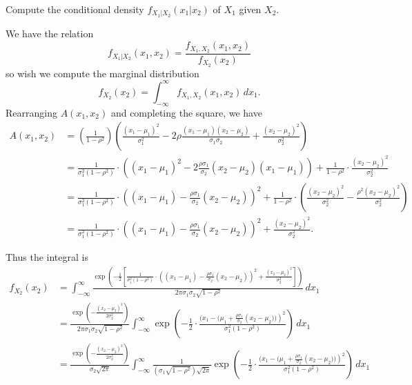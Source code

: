 \documentclass{article}
\begin{document}
\begin{enumerate}
\begin{enumerate}
		\ii Compute the conditional density $f_{X_1|X_2}(x_1|x_2)$ of $X_1$ given $X_2.$
			\begin{soln}
				We have the relation \[f_{X_1|X_2}(x_1, x_2) = \frac{f_{X_1, X_2}(x_1, x_2)}{f_{X_2}(x_2)} \] so wish we compute the marginal distribution \[f_{X_2}(x_2) = \int_{-\infty}^\infty f_{X_1, X_2}(x_1, x_2)\, dx_1. \] Rearranging $A(x_1, x_2)$ and completing the square, we have 
				\begin{align*}
					A(x_1, x_2) &= \left( \frac{1}{1-\rho^2} \right)\left(  \frac{(x_1-\mu_1)^2}{\sigma_1^2}-2\rho\frac{(x_1-\mu_1)(x_2-\mu_2)}{\sigma_1\sigma_2}+\frac{(x_2-\mu_2)^2}{\sigma_2^2}\right) \\
					&=  \frac{1}{\sigma_1^2(1-\rho^2)}\cdot \left( (x_1-\mu_1)^2 - 2\frac{\rho\sigma_1}{\sigma_2}(x_2-\mu_2)(x_1-\mu_1) \right) + \frac{1}{1-\rho^2}\cdot\frac{(x_2-\mu_2)^2}{\sigma_2^2} \\
					&= \frac{1}{\sigma_1^2(1-\rho^2)}\cdot\left( (x_1-\mu_1)-\frac{\rho\sigma_1}{\sigma_2}(x_2-\mu_2) \right)^2 + \frac{1}{1-\rho^2}\cdot\left(\frac{(x_2-\mu_2)^2}{\sigma_2^2} -\frac{\rho^2(x_2-\mu_2)^2}{\sigma_2^2}\right) \\
					&= \frac{1}{\sigma_1^2(1-\rho^2)}\cdot\left( (x_1-\mu_1)-\frac{\rho\sigma_1}{\sigma_2}(x_2-\mu_2) \right)^2 + \frac{(x_2-\mu_2)^2}{\sigma_2^2}.
				\end{align*}

				Thus the integral is 
				\begin{align*}
					f_{X_2}(x_2) &= \int_{-\infty}^\infty \frac{\exp{\left(-\frac{1}{2}\left[ \frac{1}{\sigma_1^2(1-\rho^2)}\cdot\left( (x_1-\mu_1)-\frac{\rho\sigma_1}{\sigma_2}(x_2-\mu_2) \right)^2 + \frac{(x_2-\mu_2)^2}{\sigma_2^2} \right]\right)}}{2\pi\sigma_1\sigma_2\sqrt{1-\rho^2}}\, dx_1 \\
					&= \frac{\exp{\left( -\frac{(x_2-\mu_2)^2}{2\sigma_2^2} \right)}}{2\pi\sigma_1\sigma_2\sqrt{1-\rho^2}} \int_{-\infty}^\infty \exp{\left( -\frac{1}{2}\cdot\frac{(x_1-(\mu_1+\frac{\rho\sigma_1}{\sigma_2}\left(x_2-\mu_2))\right)^2}{\sigma_1^2(1-\rho^2)} \right)}\, dx_1 \\
					&= \frac{\exp{\left( -\frac{(x_2-\mu_2)^2}{2\sigma_2^2} \right)}}{\sigma_2\sqrt{2\pi}} \int_{-\infty}^\infty \frac{1}{\left(\sigma_1\sqrt{1-\rho^2}\right)\sqrt{2\pi}}\exp{\left( -\frac{1}{2}\cdot\frac{(x_1-(\mu_1+\frac{\rho\sigma_1}{\sigma_2}\left(x_2-\mu_2))\right)^2}{\sigma_1^2(1-\rho^2)} \right)}\, dx_1
				\end{align*}


\end{soln}
\end{enumerate}
\end{enumerate}
\end{document}
